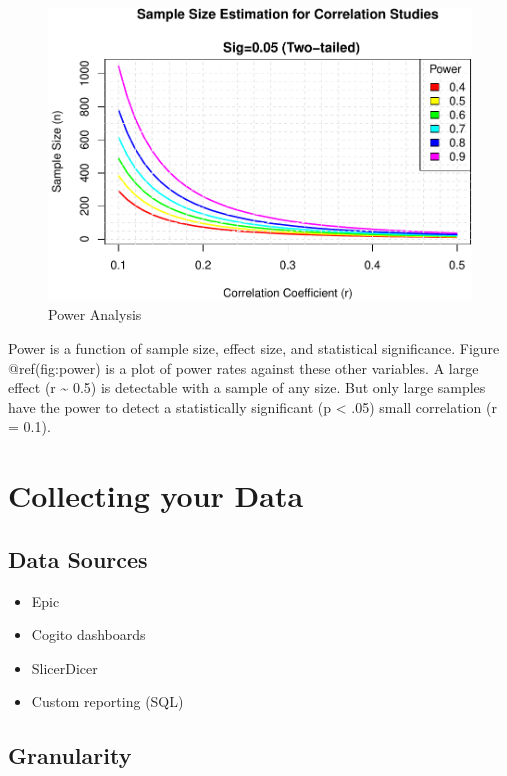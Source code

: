 \documentclass[
]{report}
\providecommand{\tightlist}{%
  \setlength{\itemsep}{0pt}\setlength{\parskip}{0pt}}
\begin{document}
\begin{figure}
\centering
\includegraphics{index_files/figure-latex/power-1.pdf}
\caption{Power Analysis}
\end{figure}

Power is a function of sample size, effect size, and statistical
significance. Figure @ref(fig:power) is a plot of power rates against
these other variables. A large effect (r \textasciitilde{} 0.5) is
detectable with a sample of any size. But only large samples have the
power to detect a statistically significant (p \textless{} .05) small
correlation (r = 0.1).

\hypertarget{collecting-your-data}{%
\chapter{Collecting your Data}\label{collecting-your-data}}

\hypertarget{data-sources}{%
\section{Data Sources}\label{data-sources}}

\begin{itemize}
\tightlist
\item
  Epic
\item
  Cogito dashboards
\item
  SlicerDicer
\item
  Custom reporting (SQL)
\end{itemize}

\hypertarget{granularity}{%
\section{Granularity}\label{granularity}}
\end{document}
